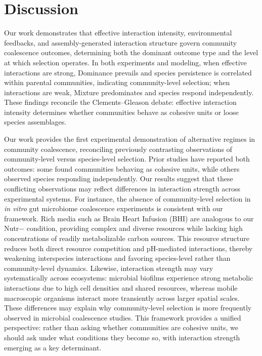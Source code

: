\section{Discussion}
\label{sec:discussion}


Our work demonstrates that effective interaction intensity, environmental feedbacks, and assembly-generated interaction structure govern community coalescence outcomes, determining both the dominant outcome type and the level at which selection operates. In both experiments and modeling, when effective interactions are strong, Dominance prevails and species persistence is correlated within parental communities, indicating community-level selection; when interactions are weak, Mixture predominates and species respond independently.  These findings reconcile the Clements--Gleason debate: effective interaction intensity determines whether communities behave as cohesive units or loose species assemblages.


Our work provides the first experimental demonstration of alternative regimes in community coalescence, reconciling previously contrasting observations of community-level versus species-level selection. Prior studies have reported both outcomes: some found communities behaving as cohesive units\citep{Tikhonov2016, DiazColunga2022}, while others observed species responding independently\citep{VanderGucht2007, Vermeij1991}. Our results suggest that these conflicting observations may reflect differences in interaction strength across experimental systems. For instance, the absence of community-level selection in \textit{in vitro} gut microbiome coalescence experiments\citep{Goldman2025, Walton2025} is consistent with our framework. Rich media such as Brain Heart Infusion (BHI) are analogous to our Nutr$-$ condition, providing complex and diverse resources while lacking high concentrations of readily metabolizable carbon sources. This resource structure reduces both direct resource competition and pH-mediated interactions, thereby weakening interspecies interactions\citep{Ratzke2020} and favoring species-level rather than community-level dynamics. Likewise, interaction strength may vary systematically across ecosystems: microbial biofilms experience strong metabolic interactions due to high cell densities and shared resources\citep{Nadell2016}, whereas mobile macroscopic organisms interact more transiently across larger spatial scales. These differences may explain why community-level selection is more frequently observed in microbial coalescence studies. This framework provides a unified perspective: rather than asking whether communities are cohesive units, we should ask under what conditions they become so, with interaction strength emerging as a key determinant.


